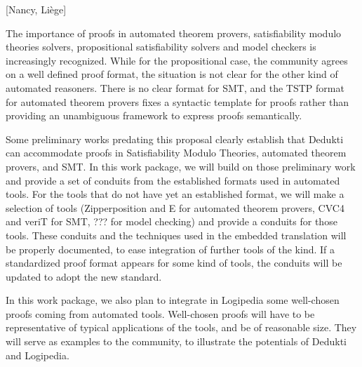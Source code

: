 [Nancy, Liège]

The importance of proofs in automated theorem provers, satisfiability modulo theories solvers, propositional satisfiability solvers and model checkers is increasingly recognized.  While for the propositional case, the community agrees on a  well defined proof format, the situation is not clear for the other kind of automated reasoners.  There is no clear format for SMT, and the TSTP format for automated theorem provers fixes a syntactic template for proofs rather than providing an unambiguous framework to express proofs semantically.

Some preliminary works predating this proposal clearly establish that Dedukti can accommodate proofs in Satisfiability Modulo Theories, automated theorem provers, and SMT.   In this work package, we will build on those preliminary work and provide a set of conduits from the established formats used in automated tools. For the tools that do not have yet an established format, we will make a selection of tools (Zipperposition and E for automated theorem provers, CVC4 and veriT for SMT, ??? for model checking) and provide a conduits for those tools.  These conduits and the techniques used in the embedded translation will be properly documented, to ease integration of further tools of the kind.  If a standardized proof format appears for some kind of tools, the conduits will be updated to adopt the new standard.

In this work package, we also plan to integrate in Logipedia some well-chosen proofs coming from automated tools.  Well-chosen proofs will have to be representative of typical applications of the tools, and be of reasonable size.  They will serve as examples to the community, to illustrate the potentials of Dedukti and Logipedia.
